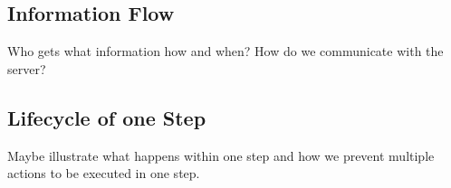 
\subsection{Information Flow}
Who gets what information how and when? How do we communicate with the server?
\subsection{Lifecycle of one Step}
Maybe illustrate what happens within one step and how we prevent multiple actions to be executed in one step.
